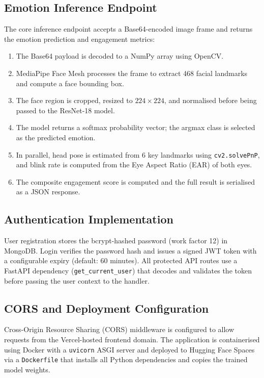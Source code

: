 \subsection{Emotion Inference Endpoint}

The core inference endpoint accepts a Base64-encoded image frame and returns
the emotion prediction and engagement metrics:

\begin{enumerate}
    \item The Base64 payload is decoded to a NumPy array using OpenCV.
    \item MediaPipe Face Mesh processes the frame to extract 468 facial
          landmarks and compute a face bounding box.
    \item The face region is cropped, resized to $224 \times 224$, and
          normalised before being passed to the ResNet-18 model.
    \item The model returns a softmax probability vector; the argmax class
          is selected as the predicted emotion.
    \item In parallel, head pose is estimated from 6 key landmarks using
          \texttt{cv2.solvePnP}, and blink rate is computed from the
          Eye Aspect Ratio (EAR) of both eyes.
    \item The composite engagement score is computed and the full result is
          serialised as a JSON response.
\end{enumerate}

\subsection{Authentication Implementation}

User registration stores the bcrypt-hashed password (work factor 12) in
MongoDB. Login verifies the password hash and issues a signed JWT token with
a configurable expiry (default: 60 minutes). All protected API routes use
a FastAPI dependency (\texttt{get\_current\_user}) that decodes and validates
the token before passing the user context to the handler.

\subsection{CORS and Deployment Configuration}

Cross-Origin Resource Sharing (CORS) middleware is configured to allow
requests from the Vercel-hosted frontend domain. The application is
containerised using Docker with a \texttt{uvicorn} ASGI server and deployed
to Hugging Face Spaces via a \texttt{Dockerfile} that installs all Python
dependencies and copies the trained model weights.

